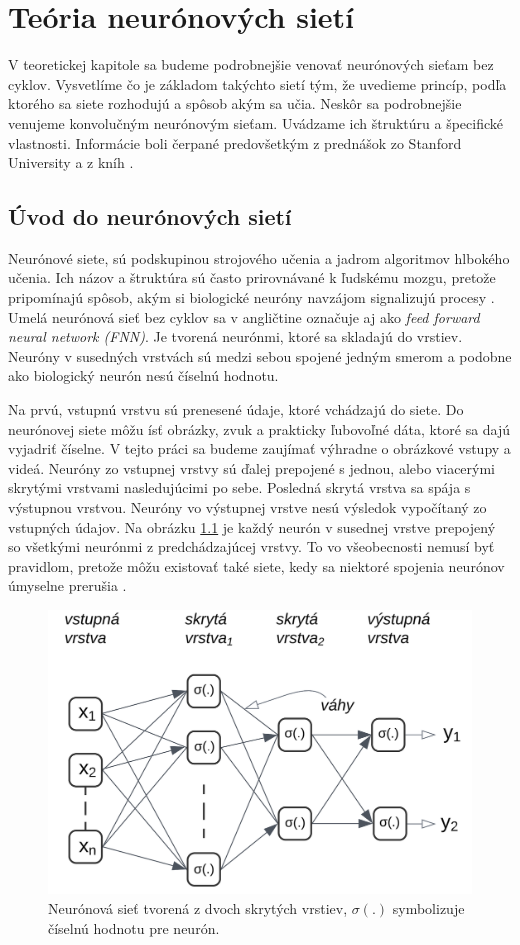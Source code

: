 \chapter{Teória neurónových sietí}\label{chap:theory}

V teoretickej kapitole sa budeme podrobnejšie venovať neurónových sieťam bez cyklov. Vysvetlíme čo je základom takýchto sietí tým, že uvedieme princíp, podľa ktorého sa siete rozhodujú a spôsob akým sa učia. Neskôr sa podrobnejšie venujeme konvolučným neurónovým sieťam. Uvádzame ich štruktúru a špecifické vlastnosti. Informácie boli čerpané predovšetkým z prednášok zo Stanford University \cite{SF} a z kníh \cite{RosinPaulL2019RIAa, Goodfellow-et-al-2016}. 

\section{Úvod do neurónových sietí}

Neurónové siete, sú podskupinou strojového učenia a jadrom algoritmov hlbokého učenia. Ich názov a štruktúra sú často prirovnávané k ľudskému mozgu, pretože pripomínajú spôsob, akým si biologické neuróny navzájom signalizujú procesy \cite{Shanmuganathan2016}. Umelá neurónová sieť bez cyklov sa v angličtine označuje aj ako \textit{feed forward neural network (FNN)}. Je tvorená neurónmi, ktoré sa skladajú do vrstiev. Neuróny v susedných vrstvách sú medzi sebou spojené jedným smerom a podobne ako biologický neurón nesú číselnú hodnotu.

Na prvú, vstupnú vrstvu sú prenesené údaje, ktoré vchádzajú do siete. Do neurónovej siete môžu ísť obrázky, zvuk a prakticky ľubovoľné dáta, ktoré sa dajú vyjadriť číselne. V tejto práci sa budeme zaujímať výhradne o obrázkové vstupy a videá. Neuróny zo vstupnej vrstvy sú ďalej prepojené s jednou, alebo viacerými skrytými vrstvami nasledujúcimi po sebe. Posledná skrytá vrstva sa spája s výstupnou vrstvou. Neuróny vo výstupnej vrstve nesú výsledok vypočítaný zo vstupných údajov. Na obrázku \ref{img:network} je každý neurón v susednej vrstve prepojený so všetkými neurónmi z predchádzajúcej vrstvy. To vo všeobecnosti nemusí byť pravidlom, pretože môžu existovať také siete, kedy sa niektoré spojenia neurónov úmyselne prerušia \cite{DettmersTim2019SNfS}.
\\
\begin{figure}[ht]
    \centering
    \includegraphics[width=.6\textwidth]{images/02/mynn.png}
    \caption{Neurónová sieť tvorená z dvoch skrytých vrstiev, \begin{math}\sigma(.)\end{math} symbolizuje číselnú hodnotu pre neurón. }
    \label{img:network}
\end{figure}

